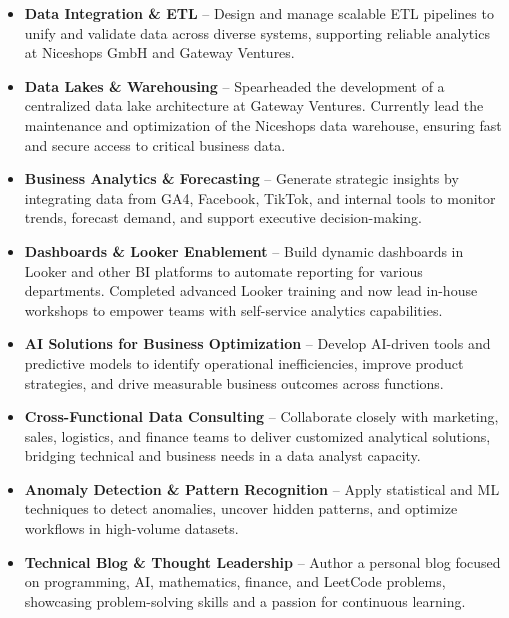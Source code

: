 \documentclass[10pt,a4paper]{altacv}
\begin{document}



\begin{itemize}
    \item \textbf{Data Integration \& ETL} – Design and manage scalable ETL pipelines to unify and validate data across diverse systems, supporting reliable analytics at Niceshops GmbH and Gateway Ventures.
    
    \item \textbf{Data Lakes \& Warehousing} – Spearheaded the development of a centralized data lake architecture at Gateway Ventures. Currently lead the maintenance and optimization of the Niceshops data warehouse, ensuring fast and secure access to critical business data.

    \item \textbf{Business Analytics \& Forecasting} – Generate strategic insights by integrating data from GA4, Facebook, TikTok, and internal tools to monitor trends, forecast demand, and support executive decision-making.

    \item \textbf{Dashboards \& Looker Enablement} – Build dynamic dashboards in Looker and other BI platforms to automate reporting for various departments. Completed advanced Looker training and now lead in-house workshops to empower teams with self-service analytics capabilities.

    \item \textbf{AI Solutions for Business Optimization} – Develop AI-driven tools and predictive models to identify operational inefficiencies, improve product strategies, and drive measurable business outcomes across functions.

    \item \textbf{Cross-Functional Data Consulting} – Collaborate closely with marketing, sales, logistics, and finance teams to deliver customized analytical solutions, bridging technical and business needs in a data analyst capacity.

    \item \textbf{Anomaly Detection \& Pattern Recognition} – Apply statistical and ML techniques to detect anomalies, uncover hidden patterns, and optimize workflows in high-volume datasets.

    \item \textbf{Technical Blog \& Thought Leadership} – Author a personal blog focused on programming, AI, mathematics, finance, and LeetCode problems, showcasing problem-solving skills and a passion for continuous learning.
\end{itemize}
\end{document}
